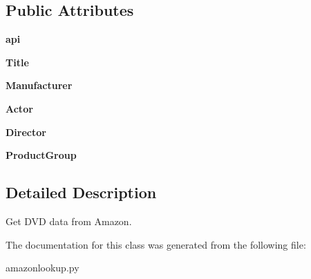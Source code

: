 \subsection*{Public Attributes}
\begin{DoxyCompactItemize}
\item 
\hypertarget{classamazonlookup_1_1DVDlookup_aed5d55b2021546ce82356ec8d7cac1e1}{
{\bfseries api}}
\label{classamazonlookup_1_1DVDlookup_aed5d55b2021546ce82356ec8d7cac1e1}

\item 
\hypertarget{classamazonlookup_1_1DVDlookup_ad1e144ffabbe30f208a8753a1950f99c}{
{\bfseries Title}}
\label{classamazonlookup_1_1DVDlookup_ad1e144ffabbe30f208a8753a1950f99c}

\item 
\hypertarget{classamazonlookup_1_1DVDlookup_ae2ec22eb3995bfef413f8f8587f566ef}{
{\bfseries Manufacturer}}
\label{classamazonlookup_1_1DVDlookup_ae2ec22eb3995bfef413f8f8587f566ef}

\item 
\hypertarget{classamazonlookup_1_1DVDlookup_a5b157bf96f97ce95bc26ffdda59f998c}{
{\bfseries Actor}}
\label{classamazonlookup_1_1DVDlookup_a5b157bf96f97ce95bc26ffdda59f998c}

\item 
\hypertarget{classamazonlookup_1_1DVDlookup_a9ede510e3c2ad1d7101278ca8308b980}{
{\bfseries Director}}
\label{classamazonlookup_1_1DVDlookup_a9ede510e3c2ad1d7101278ca8308b980}

\item 
\hypertarget{classamazonlookup_1_1DVDlookup_aa0c01f3325ffdd43870c2d36d8949e4c}{
{\bfseries ProductGroup}}
\label{classamazonlookup_1_1DVDlookup_aa0c01f3325ffdd43870c2d36d8949e4c}

\end{DoxyCompactItemize}


\subsection{Detailed Description}
\begin{DoxyVerb}
Get DVD data from Amazon.
\end{DoxyVerb}
 

The documentation for this class was generated from the following file:\begin{DoxyCompactItemize}
\item 
amazonlookup.py\end{DoxyCompactItemize}
